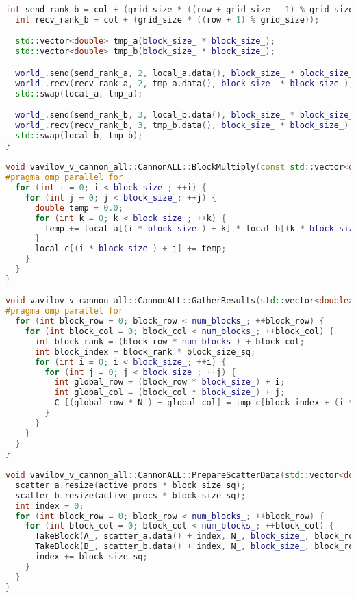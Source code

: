 \documentclass[a4paper,12pt]{article}
\begin{document}
\begin{lstlisting}[language=C++]
  int send_rank_b = col + (grid_size * ((row + grid_size - 1) % grid_size));
  int recv_rank_b = col + (grid_size * ((row + 1) % grid_size));

  std::vector<double> tmp_a(block_size_ * block_size_);
  std::vector<double> tmp_b(block_size_ * block_size_);

  world_.send(send_rank_a, 2, local_a.data(), block_size_ * block_size_);
  world_.recv(recv_rank_a, 2, tmp_a.data(), block_size_ * block_size_);
  std::swap(local_a, tmp_a);

  world_.send(send_rank_b, 3, local_b.data(), block_size_ * block_size_);
  world_.recv(recv_rank_b, 3, tmp_b.data(), block_size_ * block_size_);
  std::swap(local_b, tmp_b);
}

void vavilov_v_cannon_all::CannonALL::BlockMultiply(const std::vector<double>& local_a, const std::vector<double>& local_b, std::vector<double>& local_c) {
#pragma omp parallel for
  for (int i = 0; i < block_size_; ++i) {
    for (int j = 0; j < block_size_; ++j) {
      double temp = 0.0;
      for (int k = 0; k < block_size_; ++k) {
        temp += local_a[(i * block_size_) + k] * local_b[(k * block_size_) + j];
      }
      local_c[(i * block_size_) + j] += temp;
    }
  }
}

void vavilov_v_cannon_all::CannonALL::GatherResults(std::vector<double>& tmp_c, int block_size_sq) {
#pragma omp parallel for
  for (int block_row = 0; block_row < num_blocks_; ++block_row) {
    for (int block_col = 0; block_col < num_blocks_; ++block_col) {
      int block_rank = (block_row * num_blocks_) + block_col;
      int block_index = block_rank * block_size_sq;
      for (int i = 0; i < block_size_; ++i) {
        for (int j = 0; j < block_size_; ++j) {
          int global_row = (block_row * block_size_) + i;
          int global_col = (block_col * block_size_) + j;
          C_[(global_row * N_) + global_col] = tmp_c[block_index + (i * block_size_) + j];
        }
      }
    }
  }
}

void vavilov_v_cannon_all::CannonALL::PrepareScatterData(std::vector<double>& scatter_a, std::vector<double>& scatter_b, int active_procs, int block_size_sq) {
  scatter_a.resize(active_procs * block_size_sq);
  scatter_b.resize(active_procs * block_size_sq);
  int index = 0;
  for (int block_row = 0; block_row < num_blocks_; ++block_row) {
    for (int block_col = 0; block_col < num_blocks_; ++block_col) {
      TakeBlock(A_, scatter_a.data() + index, N_, block_size_, block_row, block_col);
      TakeBlock(B_, scatter_b.data() + index, N_, block_size_, block_row, block_col);
      index += block_size_sq;
    }
  }
}


\end{lstlisting}
\end{document}
